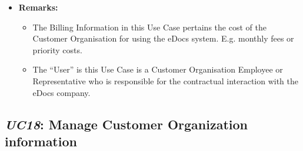 \documentclass[a4paper,10pt]{article}
\begin{document}
\begin{itemize}
	\item \textbf{Remarks:}
	   \begin{itemize}
          \item The Billing Information in this Use Case pertains the cost of the Customer Organisation for using the eDocs system. E.g. monthly fees or priority costs.
          \item The ``User'' is this Use Case is a Customer Organisation Employee or Representative who is responsible for the contractual interaction with the eDocs company.
        \end{itemize}
\end{itemize}

\subsection{\emph{UC18}: Manage Customer Organization information}
\end{document}
